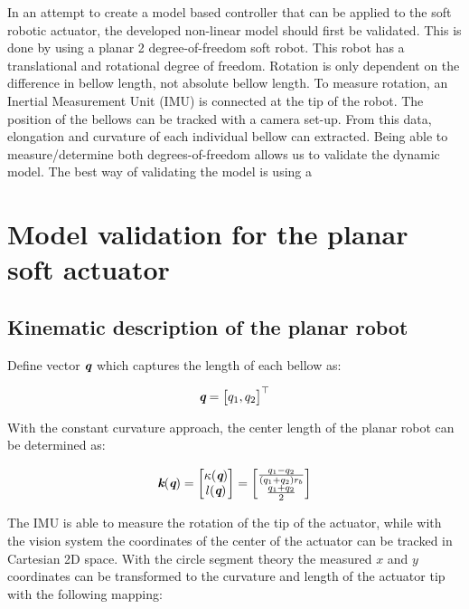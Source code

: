 In an attempt to create a model based controller that can be applied to the soft robotic actuator, the developed non-linear model should first be validated. This is done by using a planar 2 degree-of-freedom soft robot. This robot has a translational and rotational degree of freedom.  Rotation is only dependent on the difference in bellow length, not absolute bellow length. To measure rotation, an Inertial Measurement Unit (IMU) is connected at the tip of the robot. The position of the bellows can be tracked with a camera set-up. From this data, elongation and curvature of each individual bellow can extracted. Being able to measure/determine both degrees-of-freedom allows us to validate the dynamic model. The best way of validating the model is using a 


\section{Model validation for the planar soft actuator}


\subsection{Kinematic description of the planar robot}

Define vector $\textit{\textbf{q}}$ which captures the length of each bellow as:

\begin{equation}
    \textit{\textbf{q}} = \begin{bmatrix} q_1 , q_2 \end{bmatrix} ^\top
\end{equation}

With the constant curvature approach, the center length of the planar robot can be determined as:


\begin{equation}
    \textit{\textbf{k}}(\textit{\textbf{q}}) = \begin{bmatrix}  \kappa(\textit{\textbf{q}}) \\ l(\textit{\textbf{q}}) \end{bmatrix} = \begin{bmatrix} \frac{q_1-q_2}{(q_1+q_2)r_b} \\ \frac{q_1+q_2}{2} \end{bmatrix}
    \label{eq2:ccmapping}
\end{equation}

The IMU is able to measure the rotation of the tip of the actuator, while with the vision system the coordinates of the center of the actuator can be tracked in Cartesian 2D space. With the circle segment theory the measured $x$ and $y$ coordinates can be transformed to the curvature and length of the actuator tip with the following mapping:

